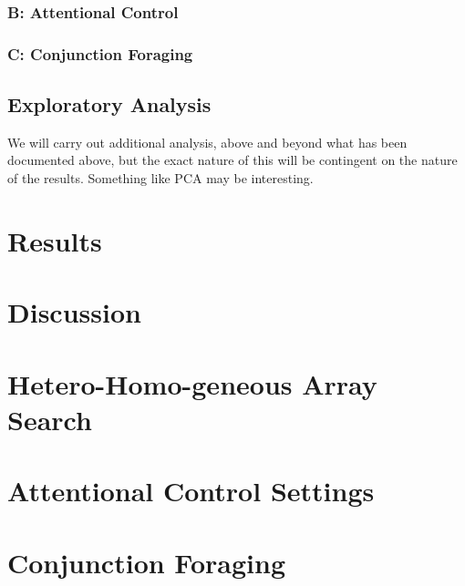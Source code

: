\documentclass[a4paper, oneside, 11pt, onecolumn]{article}
\begin{document}
\subsubsection{B: Attentional Control}

\subsubsection{C: Conjunction Foraging}

\subsubsection{}


\subsection{Exploratory Analysis}

We will carry out additional analysis, above and beyond what has been documented above, but the exact nature of this will be contingent on the nature of the results. Something like PCA may be interesting. 

\section{Results}

\section{Discussion}


\begin{appendices}
\section{Hetero-Homo-geneous Array Search}

\section{Attentional Control Settings}

\section{Conjunction Foraging}
\end{appendices}



\end{document}
